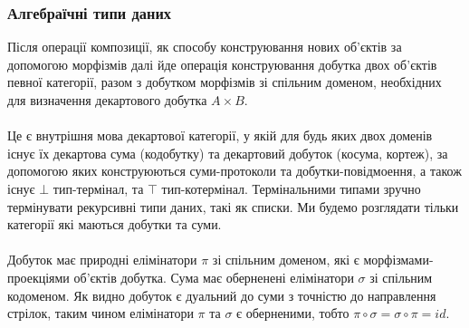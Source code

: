 \documentclass[11pt,oneside]{article}
\begin{document}
\newpage
\subsubsection*{Алгебраїчні типи даних}

Після операції композиції, як способу конструювання нових об’єктів
за допомогою морфізмів далі йде операція конструювання добутка двох об’єктів певної категорії,
разом з добутком морфізмів зі спільним доменом, необхідних для визначення декартового добутка $A \times B$.

\paragraph{}
Це є внутрішня мова декартової категорії, у якій для будь яких двох доменів існує їх декартова сума (кодобутку)
та декартовий добуток (косума, кортеж), за допомогою яких конструюються суми-протоколи та добутки-повідмоення,
а також існує $\bot$ тип-термінал, та $\top$ тип-котермінал. Термінальними типами зручно термінувати рекурсивні
типи даних, такі як списки. Ми будемо розглядати тільки категорії які маються добутки та суми.

\paragraph{}
Добуток має природні елімінатори $\pi$ зі спільним доменом, які є морфізмами-проекціями об’єктів добутка. Сума має оберненені
елімінатори $\sigma$ зі спільним кодоменом. Як видно добуток є дуальний до суми з точністю до направлення стрілок,
таким чином елімінатори $\pi$ та $\sigma$ є оберненими, тобто $\pi \circ \sigma = \sigma \circ \pi = id$.
\end{document}
